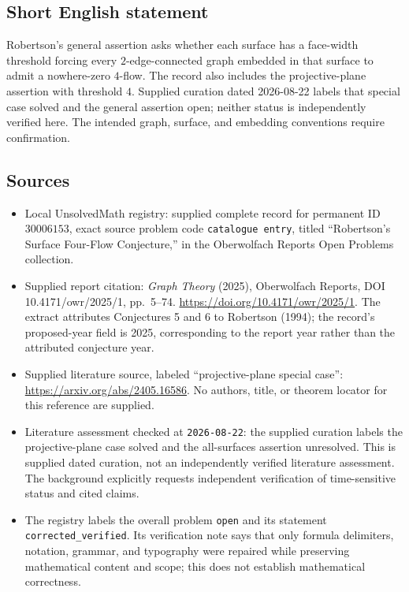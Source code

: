 \documentclass[11pt]{article}
\begin{document}
\subsection{Short English statement}
Robertson's general assertion asks whether each surface has a face-width threshold forcing every $2$-edge-connected graph embedded in that surface to admit a nowhere-zero $4$-flow. The record also includes the projective-plane assertion with threshold $4$. Supplied curation dated 2026-08-22 labels that special case solved and the general assertion open; neither status is independently verified here. The intended graph, surface, and embedding conventions require confirmation.
\subsection{Sources}
\begin{itemize}
\item Local UnsolvedMath registry: supplied complete record for permanent ID \(30006153\), exact source problem code \texttt{catalogue entry}, titled ``Robertson's Surface Four-Flow Conjecture,'' in the Oberwolfach Reports Open Problems collection.
\item Supplied report citation: \emph{Graph Theory} (2025), Oberwolfach Reports, DOI 10.4171/owr/2025/1, pp.\ 5--74. \url{https://doi.org/10.4171/owr/2025/1}. The extract attributes Conjectures 5 and 6 to Robertson (1994); the record's proposed-year field is 2025, corresponding to the report year rather than the attributed conjecture year.
\item Supplied literature source, labeled ``projective-plane special case'': \url{https://arxiv.org/abs/2405.16586}. No authors, title, or theorem locator for this reference are supplied.
\item Literature assessment checked at \texttt{2026-08-22}: the supplied curation labels the projective-plane case solved and the all-surfaces assertion unresolved. This is supplied dated curation, not an independently verified literature assessment. The background explicitly requests independent verification of time-sensitive status and cited claims.
\item The registry labels the overall problem \texttt{open} and its statement \texttt{corrected\_verified}. Its verification note says that only formula delimiters, notation, grammar, and typography were repaired while preserving mathematical content and scope; this does not establish mathematical correctness.
\end{itemize}
\end{document}
